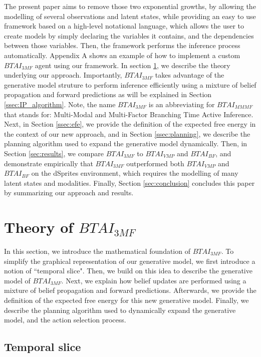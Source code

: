 \documentclass[twoside,11pt]{article}
\begin{document}
The present paper aims to remove those two exponential growths, by allowing the modelling of several observations and latent states, while providing an easy to use framework based on a high-level notational language, which allows the user to create models by simply declaring the variables it contains, and the dependencies between those variables. Then, the framework performs the inference process automatically. Appendix A shows an example of how to implement a custom $BTAI_{3MF}$ agent using our framework. In section \ref{sec:btai_3mf}, we describe the theory underlying our approach. Importantly, $BTAI_{3MF}$ takes advantage of the generative model struture to perform inference efficiently using a mixture of belief propagation \citep{BP_and_DC, believe,belief_propagation} and forward predictions as will be explained in Section \ref{ssec:IP_algorithm}. Note, the name $BTAI_{3MF}$ is an abbreviating for  $BTAI_{MMMF}$ that stands for: Multi-Modal and Multi-Factor Branching Time Active Inference. Next, in Section \ref{ssec:efe}, we provide the definition of the expected free energy in the context of our new approach, and in Section \ref{ssec:planning}, we describe the planning algorithm used to expand the generative model dynamically. Then, in Section \ref{sec:results}, we compare $BTAI_{3MF}$ to $BTAI_{VMP}$ and $BTAI_{BF}$, and demonstrate empirically that $BTAI_{3MF}$ outperformed both $BTAI_{VMP}$ and $BTAI_{BF}$ on the dSprites environment, which requires the modelling of many latent states and modalities. Finally, Section \ref{sec:conclusion} concludes this paper by summarizing our approach and results.

\section{Theory of $BTAI_{3MF}$} \label{sec:btai_3mf}

In this section, we introduce the mathematical foundation of $BTAI_{3MF}$. To simplify the graphical representation of our generative model, we first introduce a notion of ``temporal slice". Then, we build on this idea to describe the generative model of $BTAI_{3MF}$. Next, we explain how belief updates are performed using a mixture of belief propagation and forward predictions. Afterwards, we provide the definition of the expected free energy for this new generative model. Finally, we describe the planning algorithm used to dynamically expand the generative model, and the action selection process.

\subsection{Temporal slice} \label{ssec:temporal_slice}
\end{document}
